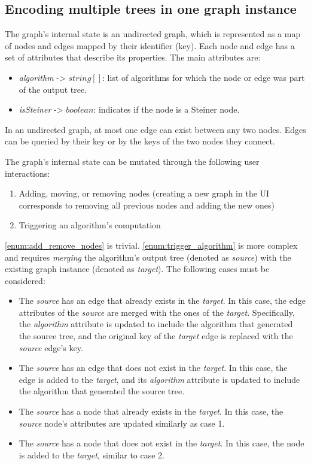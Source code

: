 \documentclass{l4proj}
\begin{document}
\subsection{Encoding multiple trees in one graph instance}
The graph's internal state is an undirected graph, which is represented as a map of nodes and edges mapped by their identifier (key). Each node and edge has a set of attributes that describe its properties. The main attributes are:
\begin{itemize}
    \item \textit{algorithm} -> $string[]$: list of algorithms for which the node or edge was part of the output tree.
    \item \textit{isSteiner} -> $boolean$: indicates if the node is a Steiner node.
\end{itemize}
In an undirected graph, at most one edge can exist between any two nodes. Edges can be queried by their key or by the keys of the two nodes they connect.

The graph's internal state can be mutated through the following user interactions:
\begin{enumerate}
    \item \label{enum:add_remove_nodes} Adding, moving, or removing nodes (creating a new graph in the UI corresponds to removing all previous nodes and adding the new ones)
    \item \label{enum:trigger_algorithm} Triggering an algorithm's computation
\end{enumerate}
\ref{enum:add_remove_nodes} is trivial.
\ref{enum:trigger_algorithm} is more complex and requires \textit{merging} the algorithm's output tree (denoted as \textit{source}) with the existing graph instance (denoted as \textit{target}). The following cases must be considered:
\begin{itemize}
    \item The \textit{source} has an edge that already exists in the \textit{target}. In this case, the edge attributes of the \textit{source} are merged with the ones of the \textit{target}. Specifically, the \textit{algorithm} attribute is updated to include the algorithm that generated the source tree, and the original key of the \textit{target} edge is replaced with the \textit{source} edge's key.
    \item The \textit{source} has an edge that does not exist in the \textit{target}. In this case, the edge is added to the \textit{target}, and its \textit{algorithm} attribute is updated to include the algorithm that generated the source tree.
    \item The \textit{source} has a node that already exists in the \textit{target}. In this case, the \textit{source} node's attributes are updated similarly as case 1.
    \item The \textit{source} has a node that does not exist in the \textit{target}. In this case, the node is added to the \textit{target}, similar to case 2.
\end{itemize}
\end{document}
